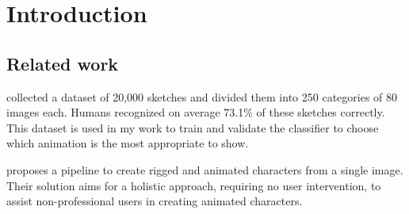 \chapter{Introduction}
\label{ch:introduction}

\section*{Related work}
\textcite{eitz2012hdhso} collected a dataset of 20,000 sketches and divided them
into 250 categories of 80 images each. Humans recognized on average 73.1\% of 
these sketches correctly. This dataset is used in my work to train and validate
the classifier to choose which animation is the most appropriate to show.

\textcite{10.1145/3469877.3490565} proposes a pipeline to create rigged and
animated characters from a single image. Their solution aims for a holistic
approach, requiring no user intervention, to assist non-professional users in
creating animated characters.